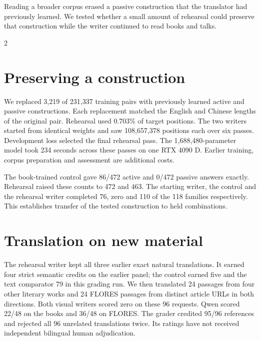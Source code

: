 \newpage
{}
\noindent Reading a broader corpus erased a passive construction that the translator had previously learned. We tested whether a small amount of rehearsal could preserve that construction while the writer continued to read books and talks.
\begin{multicols}{2}
\section*{Preserving a construction}
We replaced 3,219 of 231,337 training pairs with previously learned active and passive constructions. Each replacement matched the English and Chinese lengths of the original pair. Rehearsal used 0.703\% of target positions. The two writers started from identical weights and saw 108,657,378 positions each over six passes. Development loss selected the final rehearsal pass. The 1,688,480-parameter model took 234 seconds across these passes on one RTX 4090 D. Earlier training, corpus preparation and assessment are additional costs.
\par The book-trained control gave 86/472 active and 0/472 passive answers exactly. Rehearsal raised these counts to 472 and 463. The starting writer, the control and the rehearsal writer completed 76, zero and 110 of the 118 families respectively. This establishes transfer of the tested construction to held combinations.
\section*{Translation on new material}
The rehearsal writer kept all three earlier exact natural translations. It earned four strict semantic credits on the earlier panel; the control earned five and the text comparator 79 in this grading run. We then translated 24 passages from four other literary works and 24 FLORES passages from distinct article URLs in both directions. Both visual writers scored zero on these 96 requests. Qwen scored 22/48 on the books and 36/48 on FLORES. The grader credited 95/96 references and rejected all 96 unrelated translations twice. Its ratings have not received independent bilingual human adjudication.
\end{multicols}
